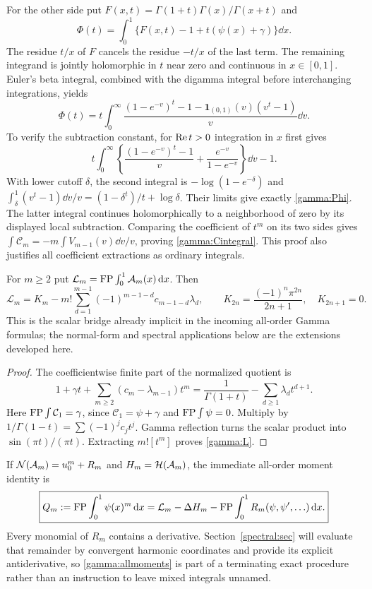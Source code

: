 For the other side put
$F(x,t)=\Gamma(1+t)\Gamma(x)/\Gamma(x+t)$ and
\[
 \Phi(t)=\int_0^1\{F(x,t)-1+t(\psi(x)+\gamma)\}\dd x.
\]
The residue $t/x$ of $F$ cancels the residue $-t/x$ of the last
term.  The remaining integrand is jointly holomorphic in $t$ near
zero and continuous in $x\in[0,1]$.
Euler's beta integral, combined with the digamma integral before
interchanging integrations, yields
\begin{equation}\label{gamma:Phi}
 \Phi(t)=t\int_0^\infty
 \frac{(1-e^{-v})^t-1-\boldsymbol1_{(0,1)}(v)(v^t-1)}v\dd v.
\end{equation}
To verify the subtraction constant, for $\operatorname{Re} t>0$ integration in
$x$ first gives
\[
 t\int_0^\infty
 \left\{\frac{(1-e^{-v})^t-1}{v}
              +\frac{e^{-v}}{1-e^{-v}}\right\}\dd v-1.
\]
With lower cutoff $\delta$, the second integral is
$-\log(1-e^{-\delta})$ and
$\int_\delta^1(v^t-1)\dd v/v=(1-\delta^t)/t+\log\delta$.
Their limits give exactly \eqref{gamma:Phi}.
The latter integral continues holomorphically to a neighborhood of
zero by its displayed local subtraction.  Comparing the coefficient
of $t^m$ on its two sides gives
$\int\mathcal C_m=-m\int V_{m-1}(v)\dd v/v$, proving
\eqref{gamma:Cintegral}.  This proof also justifies all coefficient
extractions as ordinary integrals.

\begin{theorem}
\label{gamma:scalar}
For $m\ge2$ put $\mathcal L_m=\operatorname{FP}\int_0^1\mathcal A_m(x)\,\mathrm d x$.
Then
\begin{equation}\label{gamma:L}
 \boxed{\displaystyle
 \mathcal L_m=K_m-m!\sum_{d=1}^{m-1}
       (-1)^{m-1-d}c_{m-1-d}\lambda_d,\qquad
 K_{2n}=\frac{(-1)^n\pi^{2n}}{2n+1},\quad K_{2n+1}=0.}
\end{equation}
This is the scalar bridge already implicit in the incoming all-order
Gamma formulas; the normal-form and spectral applications below
are the extensions developed here.
\end{theorem}
\begin{proof}
The coefficientwise finite part of the normalized quotient is
\[
 1+\gamma t+\sum_{m\ge2}(c_m-\lambda_{m-1})t^m
 =\frac1{\Gamma(1+t)}-\sum_{d\ge1}\lambda_d t^{d+1}.
\]
Here $\operatorname{FP}\int\mathcal C_1=\gamma$, since
$\mathcal C_1=\psi+\gamma$ and $\operatorname{FP}\int\psi=0$.
Multiply by $1/\Gamma(1-t)=\sum(-1)^jc_jt^j$.
Gamma reflection turns the scalar product into
$\sin(\pi t)/(\pi t)$.  Extracting $m![t^m]$ proves
\eqref{gamma:L}.
\end{proof}

If
$\mathcal N(\mathcal A_m)=u_0^m+R_m$ and $H_m=\mathcal H(\mathcal A_m)$, the immediate
all-order moment identity is
\begin{equation}\label{gamma:allmoments}
 \boxed{\displaystyle
 Q_m:=\operatorname{FP}\int_0^1\psi(x)^m\,\mathrm d x
   =\mathcal L_m-\Delta H_m
       -\operatorname{FP}\int_0^1R_m(\psi,\psi',\ldots)\,\mathrm d x.}
\end{equation}
Every monomial of $R_m$ contains a derivative.  Section~\ref{spectral:sec}
will evaluate that remainder by convergent harmonic coordinates and
provide its explicit antiderivative, so \eqref{gamma:allmoments} is
part of a terminating exact procedure rather than an instruction to
leave mixed integrals unnamed.
